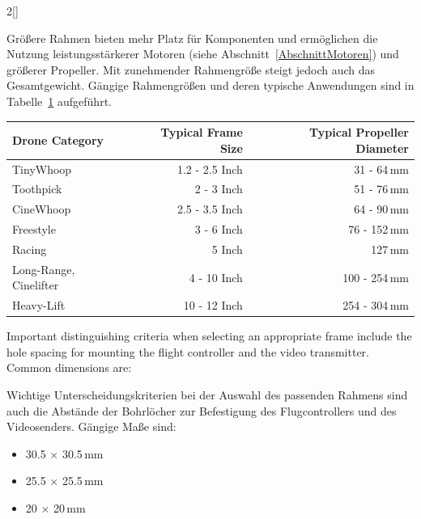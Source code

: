\begin{paracol}{2}[]
\colger

Größere Rahmen bieten mehr Platz für Komponenten und ermöglichen die Nutzung leistungsstärkerer Motoren (siehe Abschnitt~\ref{AbschnittMotoren}) und größerer Propeller. Mit zunehmender Rahmengröße steigt jedoch auch das Gesamtgewicht. Gängige Rahmengrößen und deren typische Anwendungen sind in Tabelle~\ref{TabelleRahmen} aufgeführt.

\colende

\begin{table}[htb!]
\centering
{}
\label{TabelleRahmen}
\begin{tabular}{l@{\hskip 8mm}r@{\hskip 8mm}r@{\hskip 8mm}}
\toprule
Drone Category         & Typical Frame Size & Typical Propeller Diameter \\
\midrule
TinyWhoop              & 1.2 - 2.5 Inch     & 31 - 64\,mm   \\
Toothpick              & 2   - 3 Inch       & 51 - 76\,mm   \\
CineWhoop              & 2.5 - 3.5 Inch     & 64 - 90\,mm   \\
Freestyle              & 3 - 6 Inch         & 76 - 152\,mm  \\
Racing                 & 5 Inch             & 127\,mm       \\
Long-Range, Cinelifter & 4 - 10 Inch        & 100 - 254\,mm \\
Heavy-Lift             & 10 - 12 Inch       & 254 - 304\,mm \\
\bottomrule 
\end{tabular}
\end{table}
\FloatBarrier

\colstart

Important distinguishing criteria when selecting an appropriate frame include the hole spacing for mounting the flight controller and the video transmitter. Common dimensions are:

\colger

Wichtige Unterscheidungskriterien bei der Auswahl des passenden Rahmens sind auch die Abstände der Bohrlöcher zur Befestigung des Flugcontrollers und des Videosenders. Gängige Maße sind:

\coleng

\begin{itemize}
\item 30.5 \(\times\) 30.5\,mm
\item 25.5 \(\times\) 25.5\,mm
\item 20 \(\times\) 20\,mm
\end{itemize}


\end{paracol}
